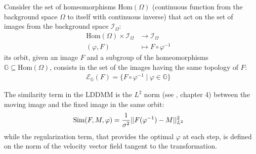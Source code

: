 Consider the set of homeomorphisms $\text{Hom}(\Omega)$ (continuous function from the background space $\Omega$ to itself with continuous inverse) that act
on the set of images from the background space $\mathcal{I}_{\Omega}$:
\begin{align*}
\text{Hom}(\Omega) \times \mathcal{I}_{\Omega} & \longrightarrow  \mathcal{I}_{\Omega}   \\
(\varphi,F) &\longmapsto F\circ \varphi^{-1}
\end{align*}
its orbit, given an image $F$ and a subgroup of the homeomorphisms $\mathbb{G}\subseteq \text{Hom}(\Omega)$, consists in the set of the images having the same topology of $F$: 
\begin{align*}
\mathcal{E}_{\mathbb{G}}(F) = \{ F\circ \varphi^{-1} \mid \varphi \in \mathbb{G} \}
\end{align*}

The similarity term in the LDDMM is the $L^{2}$ norm (see \cite{stein2009real}, chapter 4) between the moving image and the fixed image in the same orbit:
\begin{align*}
\text{Sim}(F,M,\varphi) = \frac{1}{\sigma^2}\vert\lvert F(\varphi^{-1})  - M   \rvert\vert_{L^{2}}^{2}
\end{align*}
while the regularization term, that provides the optimal $\varphi$ at each step, is defined on the norm of the velocity vector field tangent to the transformation. \\

